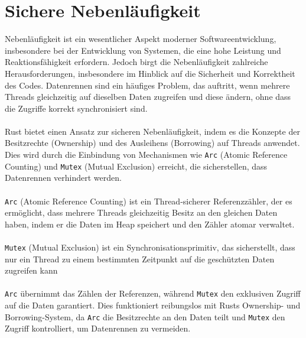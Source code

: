 \chapter{Sichere Nebenläufigkeit}

Nebenläufigkeit ist ein wesentlicher Aspekt moderner Softwareentwicklung, insbesondere bei der Entwicklung von Systemen, die eine hohe Leistung und Reaktionsfähigkeit erfordern. 
Jedoch birgt die Nebenläufigkeit zahlreiche Herausforderungen, insbesondere im Hinblick auf die Sicherheit und Korrektheit des Codes. 
Datenrennen sind ein häufiges Problem, das auftritt, wenn mehrere Threads gleichzeitig auf dieselben Daten zugreifen und diese ändern, ohne dass die Zugriffe korrekt synchronisiert sind.\\ 
\\
Rust bietet einen Ansatz zur sicheren Nebenläufigkeit, indem es die Konzepte der Besitzrechte (Ownership) und des Ausleihens (Borrowing) auf Threads anwendet. 
Dies wird durch die Einbindung von Mechanismen wie \texttt{Arc} (Atomic Reference Counting) und \texttt{Mutex} (Mutual Exclusion) erreicht, die sicherstellen, dass Datenrennen verhindert werden.\\
\\
\texttt{Arc} (Atomic Reference Counting) ist ein Thread-sicherer Referenzzähler, der es ermöglicht, dass mehrere Threads gleichzeitig Besitz an den gleichen Daten haben, indem er die Daten im Heap speichert und den Zähler atomar verwaltet. \\
\\
\texttt{Mutex} (Mutual Exclusion) ist ein Synchronisationsprimitiv, das sicherstellt, dass nur ein Thread zu einem bestimmten Zeitpunkt auf die geschützten Daten zugreifen kann\\
\\
\texttt{Arc} übernimmt das Zählen der Referenzen, während \texttt{Mutex} den exklusiven Zugriff auf die Daten garantiert. Dies funktioniert reibungslos mit Rusts Ownership- und Borrowing-System, da \texttt{Arc} die Besitzrechte an den Daten teilt und \texttt{Mutex} den Zugriff kontrolliert, um Datenrennen zu vermeiden.
\cleardoublepage
